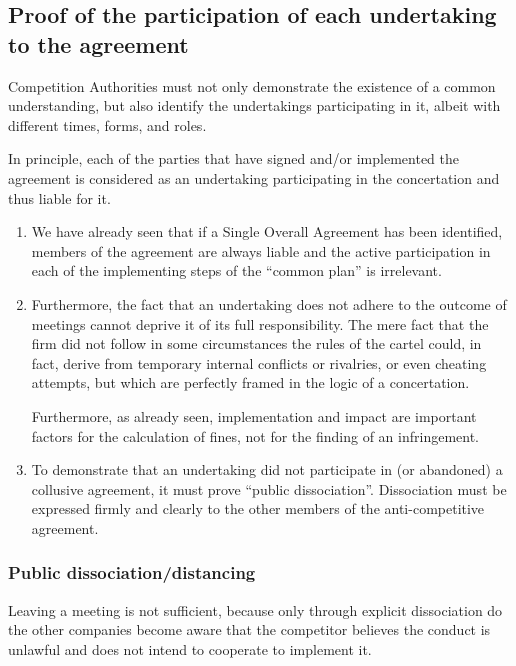     \subsection{Proof of the participation of each undertaking to the agreement}

        Competition Authorities must not only demonstrate the existence of a common understanding, but also identify the undertakings participating in it, albeit with different times, forms, and roles.

        In principle, each of the parties that have signed and/or implemented the agreement is considered as an undertaking participating in the concertation and thus liable for it.
        \begin{enumerate}
            \item We have already seen that if a Single Overall Agreement has been identified, members of the agreement are always liable and the active participation in each of the implementing steps of the “common plan” is irrelevant.
            \item Furthermore, the fact that an undertaking does not adhere to the outcome of meetings cannot deprive it of its full responsibility. The mere fact that the firm did not follow in some circumstances the rules of the cartel could, in fact, derive from temporary internal conflicts or rivalries, or even cheating attempts, but which are perfectly framed in the logic of a concertation.
        
            Furthermore, as already seen, implementation and impact are important factors for the calculation of fines, not for the finding of an infringement.
            \item To demonstrate that an undertaking did not participate in (or abandoned) a collusive agreement, it must prove ``public dissociation''. Dissociation must be expressed firmly and clearly to the other members of the anti-competitive agreement.
        \end{enumerate}

        \subsubsection{Public dissociation/distancing}

            Leaving a meeting is not sufficient, because only through explicit dissociation do the other companies become aware that the competitor believes the conduct is unlawful and does not intend to cooperate to implement it.
        
